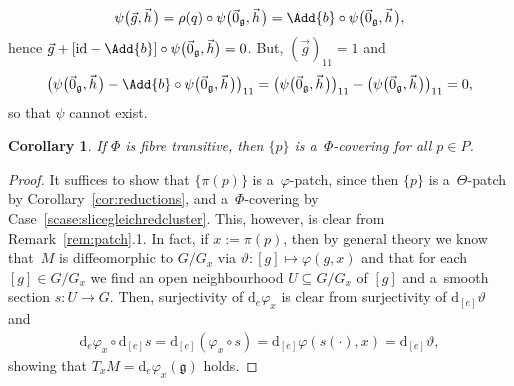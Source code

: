 \documentclass[pdftex]{sigma}
\numberwithin{equation}{section}
\newtheorem{Corollary}[Theorem]{Corollary}
\begin{document}
\begin{Example}
\begin{enumerate}
\begin{gather*}
\psi\big(\vec{g},\vec{h}\hspace{1pt}\big)=\rho(q)\circ \psi\big(\vec{0}_{\mathfrak{g}},\vec{h}\hspace{1pt}\big)=\Add{b}\circ
\psi\big(\vec{0}_{\mathfrak{g}},\vec{h}\hspace{1pt}\big),
\end{gather*}
hence $\vec{g}+\left[\mathrm{id}-\Add{b}\right]\circ \psi\big(\vec{0}_{\mathfrak{g}},\vec{h}\big)=0$.
But, $(\vec{g})_{11}=1$ and
\begin{gather*}
\big(\psi\big(\vec{0}_{\mathfrak{g}},\vec{h}\hspace{1pt}\big)-\Add{b}\circ
\psi
\big(\vec{0}_{\mathfrak{g}},\vec{h}\hspace{1pt}\big)\big)_{11}
=\big(\psi\big(\vec{0}_{\mathfrak{g}},\vec{h}\hspace{1pt}\big)\big)_{11} -\big(\psi\big(\vec{0}_{\mathfrak{g}},\vec{h}\hspace{1pt}\big)\big)_{11} =0,
\end{gather*}
so that $\psi$ cannot exist.
\end{enumerate}
\end{Example}

\begin{Corollary}\label{cor:SliceFibTran}
If $\Phi$ is fibre transitive, then $\{p\}$ is a~$\Phi$-covering for all $p\in P$.
\end{Corollary}

\begin{proof}
It suf\/f\/ices to show that $\{\pi(p)\}$ is a~$\varphi$-patch, since then $\{p\}$ is a~$\Theta$-patch by
Corollary~\ref{cor:reductions}, and a~$\Phi$-covering by Case~\ref{scase:slicegleichredcluster}.
This, however, is clear from Remark~\ref{rem:patch}.1.
In fact, if $x:=\pi(p)$, then by general theory we know that~$M$ is dif\/feomorphic to $G\slash G_{x}$ via $\vartheta
\colon [g]\mapsto \varphi(g,x)$ and that for each $[g]\in G\slash G_{x}$ we f\/ind an open neighbourhood $U\subseteq
G\slash G_{x}$ of $[g]$ and a~smooth section $s\colon U\rightarrow G$.
Then, surjectivity of $\mathrm{d}_e\varphi_x$ is clear from surjectivity of $\mathrm{d}_{[e]}\vartheta$ and
\begin{gather*}
\mathrm{d}_e\varphi_{x}\circ \mathrm{d}_{[e]}s= \mathrm{d}_{[e]}(\varphi_{x} \circ s)=
\mathrm{d}_{[e]}\varphi(s(\cdot),x)=\mathrm{d}_{[e]}\vartheta,
\end{gather*}
showing that $T_xM=\mathrm{d}_e\varphi_x(\mathfrak{g})$ holds.
\end{proof}
\end{document}
